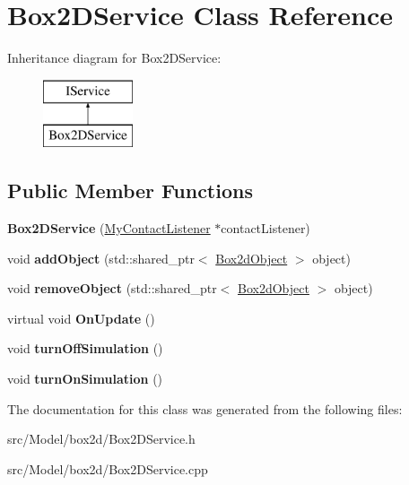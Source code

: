 \hypertarget{classBox2DService}{}\section{Box2\+D\+Service Class Reference}
\label{classBox2DService}
Inheritance diagram for Box2\+D\+Service\+:\begin{figure}[H]
\begin{center}
\leavevmode
\includegraphics[height=2.000000cm]{classBox2DService}
\end{center}
\end{figure}
\subsection*{Public Member Functions}
\begin{DoxyCompactItemize}
\item 
{\bfseries Box2\+D\+Service} (\hyperlink{classMyContactListener}{My\+Contact\+Listener} $\ast$contact\+Listener)\hypertarget{classBox2DService_a3ca3204851a4e6eae4aacde6617c4818}{}\label{classBox2DService_a3ca3204851a4e6eae4aacde6617c4818}

\item 
void {\bfseries add\+Object} (std\+::shared\+\_\+ptr$<$ \hyperlink{classBox2dObject}{Box2d\+Object} $>$ object)\hypertarget{classBox2DService_a6faffb2b4439c5ed4f49e5fa3785f4b8}{}\label{classBox2DService_a6faffb2b4439c5ed4f49e5fa3785f4b8}

\item 
void {\bfseries remove\+Object} (std\+::shared\+\_\+ptr$<$ \hyperlink{classBox2dObject}{Box2d\+Object} $>$ object)\hypertarget{classBox2DService_a4009a4f322e0be198de299168c650d54}{}\label{classBox2DService_a4009a4f322e0be198de299168c650d54}

\item 
virtual void {\bfseries On\+Update} ()\hypertarget{classBox2DService_ad09f15234a24d28af6b017f94efbb956}{}\label{classBox2DService_ad09f15234a24d28af6b017f94efbb956}

\item 
void {\bfseries turn\+Off\+Simulation} ()\hypertarget{classBox2DService_a9b5e6211e8c743d71d84a35527801a6c}{}\label{classBox2DService_a9b5e6211e8c743d71d84a35527801a6c}

\item 
void {\bfseries turn\+On\+Simulation} ()\hypertarget{classBox2DService_a309d8a33b083af6f672d7b528772c307}{}\label{classBox2DService_a309d8a33b083af6f672d7b528772c307}

\end{DoxyCompactItemize}


The documentation for this class was generated from the following files\+:\begin{DoxyCompactItemize}
\item 
src/\+Model/box2d/Box2\+D\+Service.\+h\item 
src/\+Model/box2d/Box2\+D\+Service.\+cpp\end{DoxyCompactItemize}
